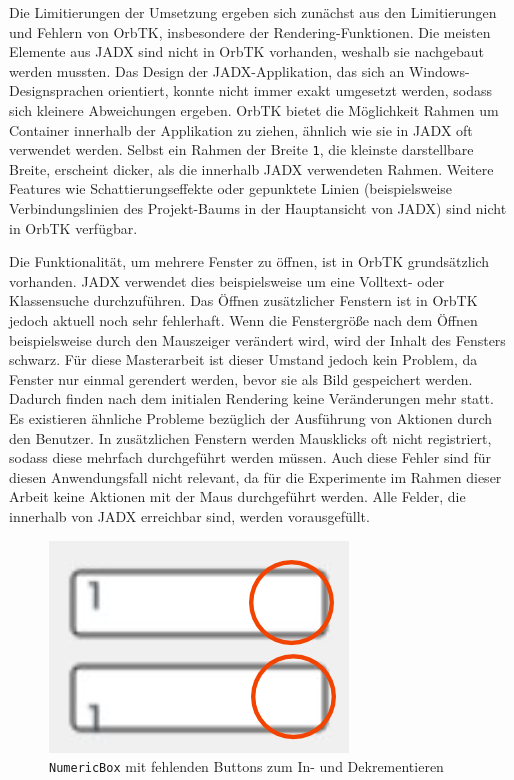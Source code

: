 Die Limitierungen der Umsetzung ergeben sich zunächst aus den Limitierungen und Fehlern von OrbTK, insbesondere der Rendering-Funktionen. Die meisten Elemente aus JADX sind nicht in OrbTK vorhanden, weshalb sie nachgebaut werden mussten. Das Design der JADX-Applikation, das sich an Windows-Designsprachen orientiert, konnte nicht immer exakt umgesetzt werden, sodass sich kleinere Abweichungen ergeben. OrbTK bietet die Möglichkeit Rahmen um Container innerhalb der Applikation zu ziehen, ähnlich wie sie in JADX oft verwendet werden. Selbst ein Rahmen der Breite \texttt{1}, die kleinste darstellbare Breite, erscheint dicker, als die innerhalb JADX verwendeten Rahmen. Weitere Features wie Schattierungseffekte oder gepunktete Linien (beispielsweise Verbindungslinien des Projekt-Baums in der Hauptansicht von JADX) sind nicht in OrbTK verfügbar.


Die Funktionalität, um mehrere Fenster zu öffnen, ist in OrbTK grundsätzlich vorhanden. JADX verwendet dies beispielsweise um eine Volltext- oder Klassensuche durchzuführen. Das Öffnen zusätzlicher Fenstern ist in OrbTK jedoch aktuell noch sehr fehlerhaft. Wenn die Fenstergröße nach dem Öffnen beispielsweise durch den Mauszeiger verändert wird, wird der Inhalt des Fensters schwarz. Für diese Masterarbeit ist dieser Umstand jedoch kein Problem, da Fenster nur einmal gerendert werden, bevor sie als Bild gespeichert werden. Dadurch finden nach dem initialen Rendering keine Veränderungen mehr statt. Es existieren ähnliche Probleme bezüglich der Ausführung von Aktionen durch den Benutzer. In zusätzlichen Fenstern werden Mausklicks oft nicht registriert, sodass diese mehrfach durchgeführt werden müssen. Auch diese Fehler sind für diesen Anwendungsfall nicht relevant, da für die Experimente im Rahmen dieser Arbeit keine Aktionen mit der Maus durchgeführt werden. Alle Felder, die innerhalb von JADX erreichbar sind, werden vorausgefüllt.

\begin{figure}[h]
    \centering
    \includegraphics[scale=0.5]{bilder/NumericBoxPfeile.png}
    \caption{\texttt{NumericBox} mit fehlenden Buttons zum In- und Dekrementieren}
    \label{fig:numeric_box}
\end{figure}


